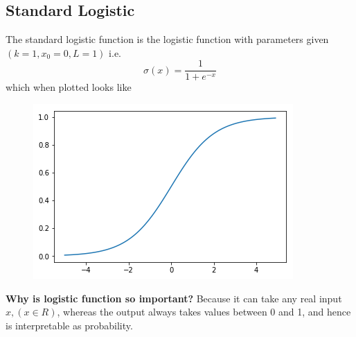 \documentclass[10pt,a4paper]{article}
\begin{document}
	\subsection{Standard Logistic}
	
	The standard logistic function is the logistic function with parameters given $(k = 1, x_0 = 0, L = 1)$
	i.e.\\
	\begin{equation}
		\sigma(x) = \frac{1}{1 + e^{-x}}
	\end{equation}
	which when plotted looks like\\
	\begin{figure}[h]
		\includegraphics[scale=0.65]{sigmoidplot}
		\centering
	\end{figure}

	\textbf{Why is logistic function so important?}
	Because it can take any real input $x, (x \in R)$, whereas the output always takes values between 0 and 1, and hence is interpretable as probability.
	

	
\end{document}
